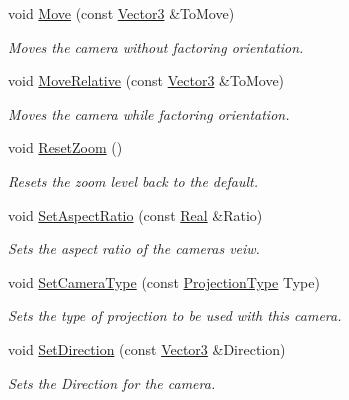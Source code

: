 \begin{DoxyCompactItemize}
void \hyperlink{classMezzanine_1_1Camera_afdc17999a097218df445370123d41239}{Move} (const \hyperlink{classMezzanine_1_1Vector3}{Vector3} \&ToMove)
\begin{DoxyCompactList}\small\item\em Moves the camera without factoring orientation. \item\end{DoxyCompactList}\item 
void \hyperlink{classMezzanine_1_1Camera_ac8f450698006baf6e8fca2a864d59533}{MoveRelative} (const \hyperlink{classMezzanine_1_1Vector3}{Vector3} \&ToMove)
\begin{DoxyCompactList}\small\item\em Moves the camera while factoring orientation. \item\end{DoxyCompactList}\item 
void \hyperlink{classMezzanine_1_1Camera_ad63ed9c54ecf0940f20c5e4fbc9a1590}{ResetZoom} ()
\begin{DoxyCompactList}\small\item\em Resets the zoom level back to the default. \item\end{DoxyCompactList}\item 
void \hyperlink{classMezzanine_1_1Camera_ab619a29b83487e8f86c8adb443689078}{SetAspectRatio} (const \hyperlink{namespaceMezzanine_a726731b1a7df72bf3583e4a97282c6f6}{Real} \&Ratio)
\begin{DoxyCompactList}\small\item\em Sets the aspect ratio of the cameras veiw. \item\end{DoxyCompactList}\item 
void \hyperlink{classMezzanine_1_1Camera_a1bc33506c8df0607777b0b122fd9c9cb}{SetCameraType} (const \hyperlink{classMezzanine_1_1Camera_a643bf90630796bca5353967664d5f6e3}{ProjectionType} Type)
\begin{DoxyCompactList}\small\item\em Sets the type of projection to be used with this camera. \item\end{DoxyCompactList}\item 
void \hyperlink{classMezzanine_1_1Camera_a3adfffaec91715cbf120bbbbc50f82db}{SetDirection} (const \hyperlink{classMezzanine_1_1Vector3}{Vector3} \&Direction)
\begin{DoxyCompactList}\small\item\em Sets the Direction for the camera. \item\end{DoxyCompactList}\item 

\end{DoxyCompactItemize}
